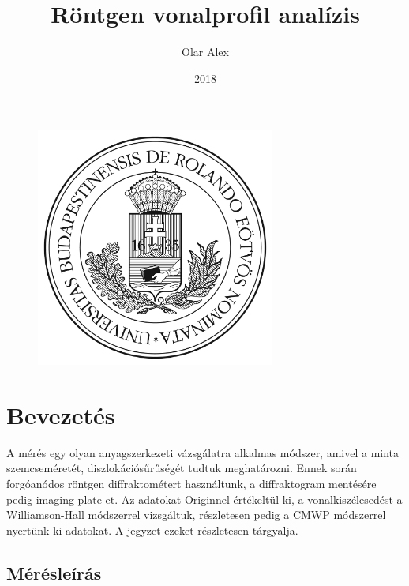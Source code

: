 \documentclass[12pt]{article}
\theoremstyle{plain}
\begin{document}
\title{Röntgen vonalprofil analízis}
\author{Olar Alex}
\date{2018}

\maketitle
\vspace*{2.5cm}
\begin{figure}[h!]
	\begin{center}
		\includegraphics[width=0.7\textwidth]{../elte.jpg}
	\end{center}
\end{figure}

\newpage

\tableofcontents

\newpage


\section{Bevezetés}

\par A mérés egy olyan anyagszerkezeti vázsgálatra alkalmas módszer, amivel a minta szemcseméretét, diszlokációsűrűségét tudtuk meghatározni. Ennek
során forgóanódos röntgen diffraktométert használtunk, a diffraktogram mentésére pedig imaging plate-et. Az adatokat Originnel értékeltül ki,
a vonalkiszélesedést a Williamson-Hall módszerrel vizsgáltuk, részletesen pedig a CMWP módszerrel nyertünk ki adatokat. A jegyzet \cite{rvaleiras}
ezeket részletesen tárgyalja.

\subsection{Mérésleírás}
\end{document}
